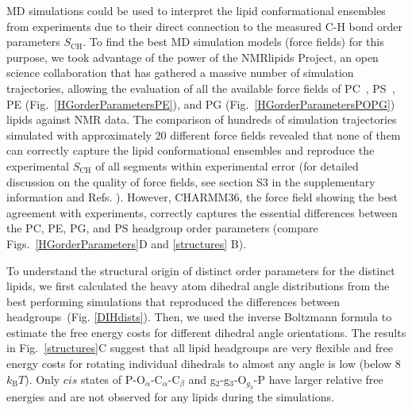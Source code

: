 \documentclass[journal=jpcbfk,manuscript=article]{achemso}
\begin{document}
MD simulations could be used to interpret the lipid conformational ensembles from experiments due to their direct connection to the measured C-H bond order parameters $S_\mathrm{CH}$. To find the best MD simulation models (force fields) for this purpose, we took advantage of the power of the NMRlipids Project, an open science collaboration that has gathered a massive number of simulation trajectories, allowing the evaluation of all the available force fields of PC~\cite{botan15}, PS~\cite{antila19}, PE (Fig.~\ref{HGorderParametersPE}), and PG (Fig.~\ref{HGorderParametersPOPG}) lipids against NMR data. The comparison of hundreds of simulation trajectories simulated with approximately 20 different force fields revealed that none of them can correctly capture the lipid conformational ensembles and reproduce the experimental $S_\mathrm{CH}$ of all segments within experimental error (for detailed discussion on the quality of force fields, see section S3 in the supplementary information and Refs. ). However, CHARMM36, the force field showing the best agreement with experiments, correctly captures the essential differences between the PC, PE, PG, and PS headgroup order parameters (compare Figs.~\ref{HGorderParameters}D and \ref{structures} B). 

To understand the structural origin of distinct order parameters for the distinct lipids,
we first calculated the heavy atom dihedral angle distributions from the best performing simulations that reproduced the differences between headgroups~(Fig. \ref{DIHdists}).
Then, we used the inverse Boltzmann formula to estimate the free
energy costs for different dihedral angle orientations.
The results in Fig.~\ref{structures}C suggest that all lipid headgroups are very flexible and free
energy costs for rotating individual dihedrals to almost any angle is low (below 8~$k_\mathrm{B}T$).
Only $cis$ states of P-O$_\alpha$-C$_\alpha$-C$_\beta$ and g$_2$-g$_3$-O$_{g_3}$-P have larger relative free
energies and are not observed for any lipids during the simulations.
\end{document}
